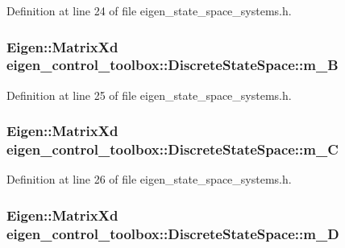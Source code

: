 Definition at line 24 of file eigen\+\_\+state\+\_\+space\+\_\+systems.\+h.

\subsubsection[{\texorpdfstring{m\+\_\+B}{m_B}}]{\setlength{\rightskip}{0pt plus 5cm}Eigen\+::\+Matrix\+Xd eigen\+\_\+control\+\_\+toolbox\+::\+Discrete\+State\+Space\+::m\+\_\+B\hspace{0.3cm}{\ttfamily [protected]}}\hypertarget{classeigen__control__toolbox_1_1_discrete_state_space_a070fcc68df2ae0b39af3d308a1c5011f}{}\label{classeigen__control__toolbox_1_1_discrete_state_space_a070fcc68df2ae0b39af3d308a1c5011f}


Definition at line 25 of file eigen\+\_\+state\+\_\+space\+\_\+systems.\+h.

\subsubsection[{\texorpdfstring{m\+\_\+C}{m_C}}]{\setlength{\rightskip}{0pt plus 5cm}Eigen\+::\+Matrix\+Xd eigen\+\_\+control\+\_\+toolbox\+::\+Discrete\+State\+Space\+::m\+\_\+C\hspace{0.3cm}{\ttfamily [protected]}}\hypertarget{classeigen__control__toolbox_1_1_discrete_state_space_ac3a719d7d124200b9d67b9df525024bb}{}\label{classeigen__control__toolbox_1_1_discrete_state_space_ac3a719d7d124200b9d67b9df525024bb}


Definition at line 26 of file eigen\+\_\+state\+\_\+space\+\_\+systems.\+h.

\subsubsection[{\texorpdfstring{m\+\_\+D}{m_D}}]{\setlength{\rightskip}{0pt plus 5cm}Eigen\+::\+Matrix\+Xd eigen\+\_\+control\+\_\+toolbox\+::\+Discrete\+State\+Space\+::m\+\_\+D\hspace{0.3cm}{\ttfamily [protected]}}\hypertarget{classeigen__control__toolbox_1_1_discrete_state_space_a1f3638e25fd3c1fb9187426133a1a6e3}{}\label{classeigen__control__toolbox_1_1_discrete_state_space_a1f3638e25fd3c1fb9187426133a1a6e3}


